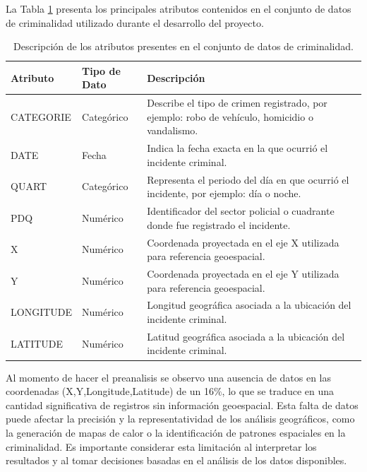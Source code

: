 \documentclass[12pt]{article}
\begin{document}
La Tabla \ref{tab:atributos_dataset} presenta los principales atributos contenidos en el conjunto de datos de criminalidad utilizado durante el desarrollo del proyecto.

\begin{table}[H]
\renewcommand{\arraystretch}{1.4}
\centering

\begin{tabularx}{\textwidth}{|>{\ttfamily\small}p{4cm}|>{\centering\arraybackslash}m{2.5cm}|X|}
\hline
\rowcolor[HTML]{EFEFEF}
\textbf{Atributo} & \textbf{Tipo de Dato} & \textbf{Descripción} \\ \hline

CATEGORIE & Categórico &
Describe el tipo de crimen registrado, por ejemplo: robo de vehículo, homicidio o vandalismo. \\ \hline

DATE & Fecha &
Indica la fecha exacta en la que ocurrió el incidente criminal. \\ \hline

QUART & Categórico &
Representa el periodo del día en que ocurrió el incidente, por ejemplo: día o noche. \\ \hline

PDQ & Numérico &
Identificador del sector policial o cuadrante donde fue registrado el incidente. \\ \hline

X & Numérico &
Coordenada proyectada en el eje X utilizada para referencia geoespacial. \\ \hline

Y & Numérico &
Coordenada proyectada en el eje Y utilizada para referencia geoespacial. \\ \hline

LONGITUDE & Numérico &
Longitud geográfica asociada a la ubicación del incidente criminal. \\ \hline

LATITUDE & Numérico &
Latitud geográfica asociada a la ubicación del incidente criminal. \\ \hline

\end{tabularx}

\caption{Descripción de los atributos presentes en el conjunto de datos de criminalidad.}
\label{tab:atributos_dataset}

\end{table}

Al momento de hacer el preanalisis se observo una ausencia de datos en las coordenadas (X,Y,Longitude,Latitude)
de un 16$\%$, lo que se traduce en una cantidad significativa de registros sin información geoespacial. Esta falta de datos puede afectar la precisión y la representatividad de los análisis geográficos, como la generación de mapas de calor o la identificación de patrones espaciales en la criminalidad. Es importante considerar esta limitación al interpretar los resultados y al tomar decisiones basadas en el análisis de los datos disponibles.
\end{document}
